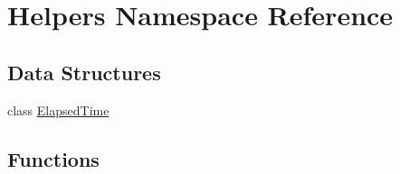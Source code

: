 \hypertarget{namespace_helpers}{}\section{Helpers Namespace Reference}
\label{namespace_helpers}
\subsection*{Data Structures}
\begin{DoxyCompactItemize}
\item 
class \hyperlink{class_helpers_1_1_elapsed_time}{Elapsed\+Time}
\end{DoxyCompactItemize}
\subsection*{Functions}
